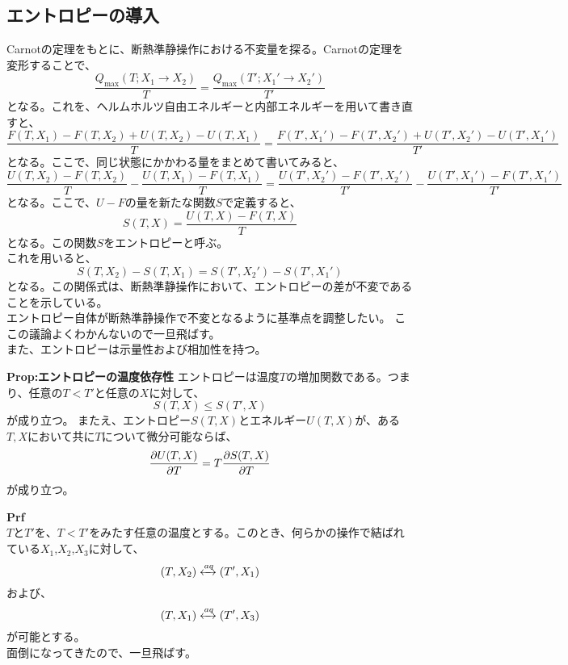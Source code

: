 \documentclass[a4paper,11pt]{jsarticle}
\numberwithin{equation}{section}
\begin{document}
\subsection{エントロピーの導入}
Carnotの定理をもとに、断熱準静操作における不変量を探る。Carnotの定理を変形することで、
\begin{equation}
    \frac{Q_{\text{max}}(T;X_1\rightarrow X_2)}{T} = \frac{Q_{\text{max}}(T';X_1'\rightarrow X_2')}{T'}
\end{equation}
となる。これを、ヘルムホルツ自由エネルギーと内部エネルギーを用いて書き直すと、
\begin{equation}
    \frac{F(T,X_1)-F(T,X_2)+U(T,X_2)-U(T,X_1)}{T} = \frac{F(T',X_1')-F(T',X_2')+U(T',X_2')-U(T',X_1')}{T'}
\end{equation}
となる。ここで、同じ状態にかかわる量をまとめて書いてみると、
\begin{equation}
    \frac{U(T,X_2)-F(T,X_2)}{T} - \frac{U(T,X_1)-F(T,X_1)}{T} = \frac{U(T',X_2')-F(T',X_2')}{T'} - \frac{U(T',X_1')-F(T',X_1')}{T'}
\end{equation}
となる。ここで、$U-F$の量を新たな関数$S$で定義すると、
\begin{equation}
    S(T,X) = \frac{U(T,X)-F(T,X)}{T}
\end{equation}
となる。この関数$S$をエントロピーと呼ぶ。\\
これを用いると、
\begin{equation}
    S(T,X_2)-S(T,X_1) = S(T',X_2')-S(T',X_1')
\end{equation}
となる。この関係式は、断熱準静操作において、エントロピーの差が不変であることを示している。\\
エントロピー自体が断熱準静操作で不変となるように基準点を調整したい。
ここの議論よくわかんないので一旦飛ばす。\\

また、エントロピーは示量性および相加性を持つ。\\

\begin{itembox}[l]{\textbf{Prop:エントロピーの温度依存性}}
エントロピーは温度$T$の増加関数である。つまり、任意の$T<T'$と任意の$X$に対して、
\begin{equation}
    S(T,X) \leq S(T',X)
\end{equation}
が成り立つ。
またえ、エントロピー$S(T,X)$とエネルギー$U(T,X)$が、ある$T,X$において共に$T$について微分可能ならば、
\begin{equation}
    \pdv{U(T,X)}{T} = T\pdv{S(T,X)}{T}
\end{equation}
が成り立つ。
\end{itembox}
\textbf{Prf}\\
$T$と$T'$を、$T < T'$をみたす任意の温度とする。このとき、何らかの操作で結ばれている$X_1$,$X_2$,$X_3$に対して、
\begin{equation}
    (T,X_2) \xleftrightarrow{aq} (T',X_1)
\end{equation}
および、
\begin{equation}
    (T,X_1) \xleftrightarrow{aq} (T',X_3)
\end{equation}
が可能とする。\\
面倒になってきたので、一旦飛ばす。\\
\end{document}
